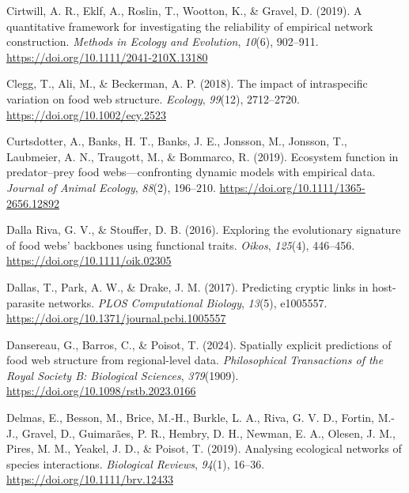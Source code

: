 \documentclass[
]{article}
\newlength{\cslhangindent}
\newenvironment{CSLReferences}[2] %
 {\begin{list}{}{%
  \setlength{\itemindent}{0pt}
  \setlength{\leftmargin}{0pt}
  \setlength{\parsep}{0pt}
  \ifodd #1
   \setlength{\leftmargin}{\cslhangindent}
   \setlength{\itemindent}{-1\cslhangindent}
  \fi
  \setlength{\itemsep}{#2\baselineskip}}}
 {\end{list}}
\begin{document}
\begin{CSLReferences}{1}{0}
Cirtwill, A. R., Eklf, A., Roslin, T., Wootton, K., \& Gravel, D.
(2019). A quantitative framework for investigating the reliability of
empirical network construction. \emph{Methods in Ecology and Evolution},
\emph{10}(6), 902--911. \url{https://doi.org/10.1111/2041-210X.13180}

Clegg, T., Ali, M., \& Beckerman, A. P. (2018). The impact of
intraspecific variation on food web structure. \emph{Ecology},
\emph{99}(12), 2712--2720. \url{https://doi.org/10.1002/ecy.2523}

Curtsdotter, A., Banks, H. T., Banks, J. E., Jonsson, M., Jonsson, T.,
Laubmeier, A. N., Traugott, M., \& Bommarco, R. (2019). Ecosystem
function in predator--prey food webs---confronting dynamic models with
empirical data. \emph{Journal of Animal Ecology}, \emph{88}(2),
196--210. \url{https://doi.org/10.1111/1365-2656.12892}

Dalla Riva, G. V., \& Stouffer, D. B. (2016). Exploring the evolutionary
signature of food webs' backbones using functional traits. \emph{Oikos},
\emph{125}(4), 446--456. \url{https://doi.org/10.1111/oik.02305}

Dallas, T., Park, A. W., \& Drake, J. M. (2017). Predicting cryptic
links in host-parasite networks. \emph{PLOS Computational Biology},
\emph{13}(5), e1005557.
\url{https://doi.org/10.1371/journal.pcbi.1005557}

Dansereau, G., Barros, C., \& Poisot, T. (2024). Spatially explicit
predictions of food web structure from regional-level data.
\emph{Philosophical Transactions of the Royal Society B: Biological
Sciences}, \emph{379}(1909).
\url{https://doi.org/10.1098/rstb.2023.0166}

Delmas, E., Besson, M., Brice, M.-H., Burkle, L. A., Riva, G. V. D.,
Fortin, M.-J., Gravel, D., Guimarães, P. R., Hembry, D. H., Newman, E.
A., Olesen, J. M., Pires, M. M., Yeakel, J. D., \& Poisot, T. (2019).
Analysing ecological networks of species interactions. \emph{Biological
Reviews}, \emph{94}(1), 16--36. \url{https://doi.org/10.1111/brv.12433}


\end{CSLReferences}
\end{document}
